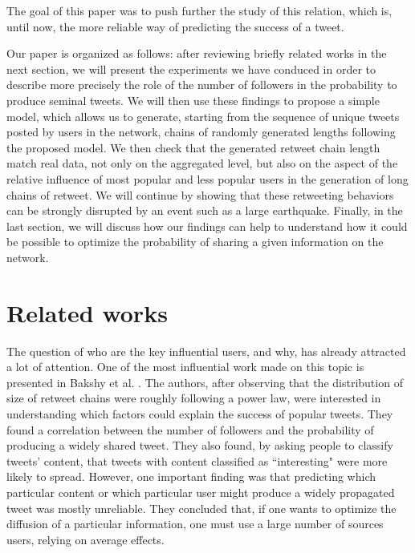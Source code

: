 \documentclass[conference]{IEEEtran}
\begin{document}
The goal of this paper was to push further the study of this relation, which is, until now, the more reliable way of predicting the success of a tweet.

Our paper is organized as follows: after reviewing briefly related works in the next section, we will present the experiments we have conduced in order to describe more precisely the role of the number of followers in the probability to produce seminal tweets. We will then use these findings to propose a simple model, which allows us to generate, starting from the sequence of unique tweets posted by users in the network, chains of randomly generated lengths following the proposed model. We then check that the generated retweet chain length match real data, not only on the aggregated level, but also on the aspect of the relative influence of most popular and less popular users in the generation of long chains of retweet.
We will continue by showing that these retweeting behaviors can be strongly disrupted by an event such as a large earthquake.
Finally, in the last section, we will discuss how our findings can help to understand how it could be possible to optimize the probability of sharing a given information on the network.


\section{Related works}
The question of who are the key influential users, and why, has already attracted a lot of attention. One of the most influential work made on this topic is presented in Bakshy et al.  \cite{bakshy2011everyone}. The authors, after observing that the distribution of size of retweet chains were roughly following a power law, were interested in understanding which factors could explain the success of popular tweets. They found a correlation between the number of followers and the probability of producing a widely shared tweet. They also found, by asking people to classify tweets' content, that tweets with content classified as ``interesting" were more likely to spread. However, one important finding was that predicting which particular content or which particular user might produce a widely propagated tweet was mostly unreliable. They concluded that, if one wants to optimize the diffusion of a particular information, one must use a large number of sources users, relying on average effects.
\end{document}

